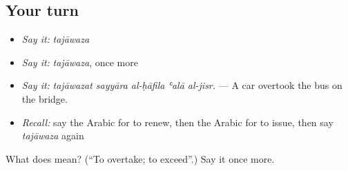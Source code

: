 \subsection*{Your turn}
\begin{itemize}
\raggedright
  \item \emph{Say it:} \emph{tajāwaza}
  \item \emph{Say it:} \emph{tajāwaza}, once more
  \item \emph{Say it:} \emph{tajāwazat sayyāra al-ḥāfila ʿalā al-jisr.} — A car overtook the bus on the bridge.
  \item \emph{Recall:} say the Arabic for to renew, then the Arabic for to issue, then say \emph{tajāwaza} again
\end{itemize}

\begin{tcolorbox}[breakable,colback=teal!4,colframe=teal!35!black,title={Before you move on}]
What does  mean? (\textquotedblleft{}To overtake; to exceed\textquotedblright{}.) Say it once more.
\end{tcolorbox}

